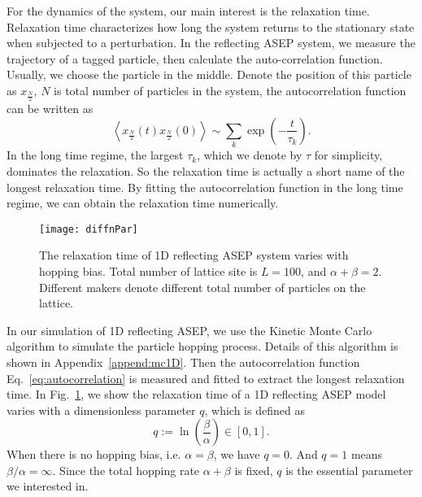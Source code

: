For the dynamics of the system, our main interest is the relaxation time. Relaxation time characterizes how long the system returns to the stationary state when subjected to a perturbation. In the reflecting ASEP system, we measure the trajectory of a tagged particle, then calculate the auto-correlation function. Usually, we choose the particle in the middle. Denote the position of this particle as $x_{\frac{N}{2}}$, $N$ is total number of particles in the system, the autocorrelation function can be written as 
\begin{equation}
    \label{eq:autocorrelation}
    \left< x_{\frac{N}{2}}(t) x_{\frac{N}{2}}(0) \right> 
    \sim \sum_{k}\exp\left(-\frac{t}{\tau_k}\right).
\end{equation}
In the long time regime, the largest $\tau_k$, which we denote by $\tau$ for simplicity, dominates the relaxation. So the relaxation time is actually a short name of the longest relaxation time. By fitting the autocorrelation function in the long time regime, we can obtain the relaxation time numerically. 
\begin{figure}[htpb]
    \centering
    \texttt{[image: diffnPar]}
    \caption{The relaxation time of 1D reflecting ASEP system varies with hopping bias. Total number of lattice site is $L=100$, and $\alpha+\beta=2$. Different makers denote different total number of particles on the lattice. }
    \label{fig:diffnPar}
\end{figure}

In our simulation of 1D reflecting ASEP, we use the Kinetic Monte Carlo algorithm to simulate the particle hopping process. Details of this algorithm is shown in Appendix~\ref{append:mc1D}. Then the autocorrelation function Eq.~\eqref{eq:autocorrelation} is measured and fitted to extract the longest relaxation time. 
In Fig.~\ref{fig:diffnPar}, we show the relaxation time of a 1D reflecting ASEP model varies with a dimensionless parameter $q$, which is defined as 
\begin{equation}
    \label{eq:hoppingBias}
    q:= \ln\left(\frac{\beta}{\alpha}\right)\in\left[0,1\right].
\end{equation}
When there is no hopping bias, i.e. $\alpha=\beta$, we have $q=0$. And $q=1$ means $\beta/\alpha = \infty$.
Since the total hopping rate $\alpha + \beta$ is fixed, $q$ is the essential parameter we interested in.

